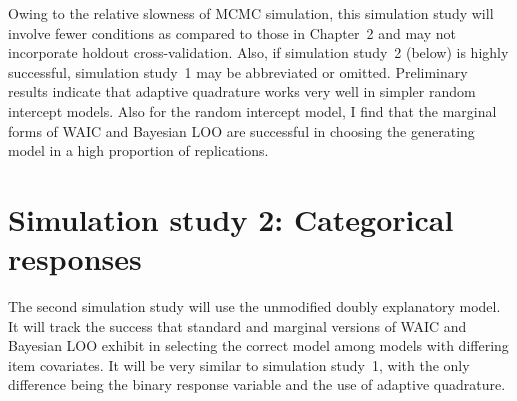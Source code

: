 Owing to the relative slowness of MCMC simulation, this simulation study will involve fewer conditions as compared to those in Chapter~2 and may not incorporate holdout cross-validation. Also, if simulation study~2 (below) is highly successful, simulation study~1 may be abbreviated or omitted. Preliminary results indicate that adaptive quadrature works very well in simpler random intercept models. Also for the random intercept model, I find that the marginal forms of WAIC and Bayesian LOO are successful in choosing the generating model in a high proportion of replications.


\section{Simulation study 2: Categorical responses}

The second simulation study will use the unmodified doubly explanatory model. It will track the success that standard and marginal versions of WAIC and Bayesian LOO exhibit in selecting the correct model among models with differing item covariates. It will be very similar to simulation study~1, with the only difference being the binary response variable and the use of adaptive quadrature.